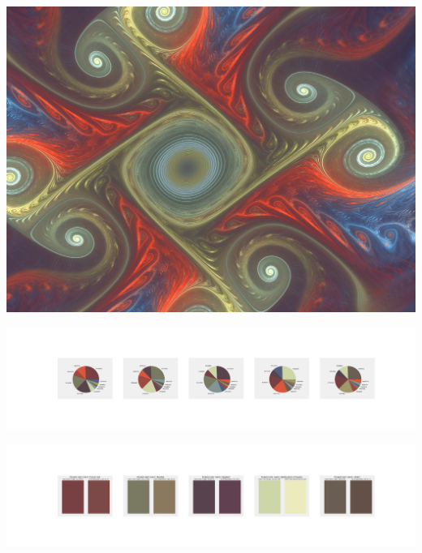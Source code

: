 \documentclass[11pt]{article}
\begin{document}
\begin{landscape}
    \begin{center}
    \includegraphics[width=\textwidth]{./nbimg/file (219).jpg}
    \end{center}

    \begin{center}
    \includegraphics[width=250mm]{./nbimg/pie-133.jpg}
    \end{center}

    \begin{center}
    \includegraphics[width=250mm]{./nbimg/peak-133.jpg}
    \end{center}
    


\end{landscape}
\end{document}
